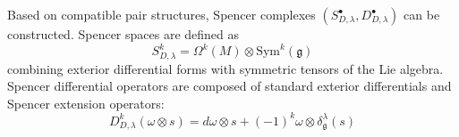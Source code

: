 \documentclass[a4paper,12pt]{extarticle}
\theoremstyle{definition}
\begin{document}
Based on compatible pair structures, Spencer complexes $(S^{\bullet}_{D,\lambda}, D^{\bullet}_{D,\lambda})$ can be constructed. Spencer spaces are defined as
\begin{equation}\label{eq:spencer-space}
S^k_{D,\lambda} = \Omega^k(M) \otimes \mathrm{Sym}^k(\mathfrak{g})
\end{equation}
combining exterior differential forms with symmetric tensors of the Lie algebra. Spencer differential operators are composed of standard exterior differentials and Spencer extension operators:
\begin{equation}\label{eq:spencer-diff}
D^k_{D,\lambda}(\omega \otimes s) = d\omega \otimes s + (-1)^k\omega \otimes \delta^{\lambda}_{\mathfrak{g}}(s)
\end{equation}


\end{document}
